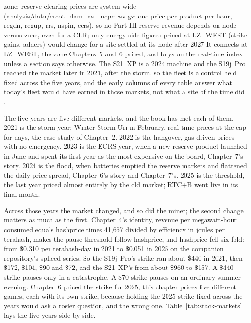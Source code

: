 zone; reserve clearing prices are system-wide (analysis/data/ercot_dam_as_mcpc.csv.gz: one price per product per hour, regdn, regup, rrs, nspin, ecrs), so no Part III reserve revenue depends on node versus zone, even for a CLR; only energy-side figures priced at LZ_WEST (strike gains, adders) would change for a site settled at its node after 2027
It connects at LZ\_WEST, the zone Chapters~5 and~6 priced, and buys on the real-time index unless a section says otherwise. The S21~XP is a 2024 machine and the S19j~Pro reached the market later in 2021, after the storm, so the fleet is a control held fixed across the five years, and the early columns of every table answer what today's fleet would have earned in those markets, not what a site of the time did \autocite{bitmain2021s19jpro,bitmain2024s21xp}. %

The five years are five different markets, and the book has met each of them. 2021 is the storm year: Winter Storm Uri in February, real-time prices at the cap for days, the case study of Chapter~2. 2022 is the hangover, gas-driven prices with no emergency. 2023 is the ECRS year, when a new reserve product launched in June and spent its first year as the most expensive on the board, Chapter~7's story. 2024 is the flood, when batteries emptied the reserve markets and flattened the daily price spread, Chapter~6's story and Chapter~7's. 2025 is the threshold, the last year priced almost entirely by the old market; RTC+B went live in its final month. %

Across those years the market changed, and so did the miner; the second change matters as much as the first. Chapter~4's identity, revenue per megawatt-hour consumed equals hashprice times 41,667 divided by efficiency in joules per terahash, makes the pause threshold follow hashprice, and hashprice fell six-fold: from \$0.310 per terahash-day in 2021 to \$0.051 in 2025 on the companion repository's spliced series. So the S19j~Pro's strike ran about \$440 in 2021, then \$172, \$104, \$90 and \$72, and the S21~XP's from about \$960 to \$157. %
A \$440 strike pauses only in a catastrophe. A \$70 strike pauses on an ordinary summer evening. Chapter~6 priced the strike for 2025; this chapter prices five different games, each with its own strike, because holding the 2025 strike fixed across the years would ask a rosier question, and the wrong one. Table~\ref{tab:stack-markets} lays the five years side by side.


